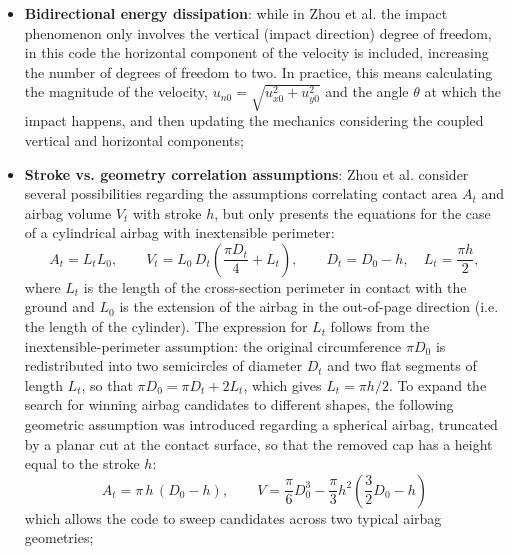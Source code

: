 \begin{itemize}
  \item \textbf{Bidirectional energy dissipation}: while in Zhou et al. the impact phenomenon only involves the vertical (impact direction) degree of freedom, in this code the horizontal component of the velocity is included, increasing the number of degrees of freedom to two. In practice, this means calculating the magnitude of the velocity, $u_{n0} = \sqrt{u_{x0}^2 + u_{y0}^2}$ and the angle $\theta$ at which the impact happens, and then updating the mechanics considering the coupled vertical and horizontal components;
  
  \item \textbf{Stroke vs. geometry correlation assumptions}: Zhou et al. consider several possibilities regarding the assumptions correlating contact area $A_t$ and airbag volume $V_t$ with stroke $h$, but only presents the equations for the case of a cylindrical airbag with inextensible perimeter:
  \begin{equation}\label{eq:geometry_cyl}
    A_t = L_t L_0, \qquad V_t = L_0\,D_t\left(\frac{\pi D_t}{4} + L_t\right),
    \qquad D_t = D_0 - h,\quad L_t = \frac{\pi h}{2},
  \end{equation}
  where $L_t$ is the length of the cross-section perimeter in contact with the ground and $L_0$ is the extension of the airbag in the out-of-page direction (i.e. the length of the cylinder). The expression for $L_t$ follows from the inextensible-perimeter assumption: the original circumference $\pi D_0$ is redistributed into two semicircles of diameter $D_t$ and two flat segments of length $L_t$, so that $\pi D_0 = \pi D_t + 2L_t$, which gives $L_t = \pi h/2$.
  To expand the search for winning airbag candidates to different shapes, the following geometric assumption was introduced regarding a spherical airbag, truncated by a planar cut at the contact surface, so that the removed cap has a height equal to the stroke $h$:
  \begin{equation}\label{eq:geometry_sph}
    A_t = \pi\,h\,(D_0 - h), \qquad V = \frac{\pi}{6}D_0^3 - \frac{\pi}{3}h^2\left(\frac{3}{2}D_0 - h\right)
  \end{equation}
  which allows the code to sweep candidates across two typical airbag geometries;


\end{itemize}
